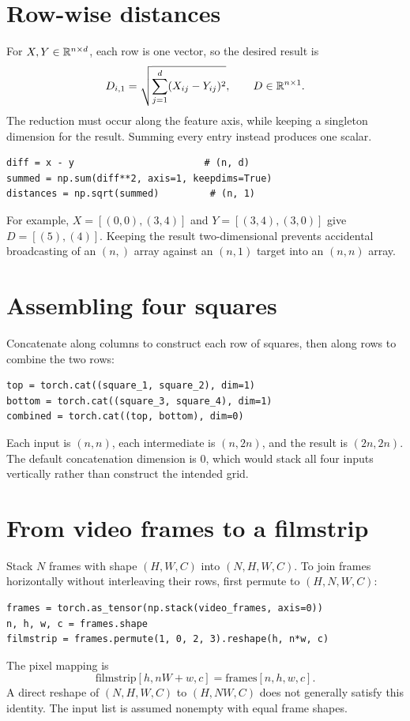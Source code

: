 


\section{Row-wise distances}
For $X,Y\in\mathbb{R}^{n\times d}$, each row is one vector, so the desired result is
\[
 D_{i,1}=\sqrt{\sum_{j=1}^d(X_{ij}-Y_{ij})^2},\qquad D\in\mathbb{R}^{n\times1}.
\]
The reduction must occur along the feature axis, while keeping a singleton
dimension for the result. Summing every entry instead produces one scalar.
\begin{lstlisting}
diff = x - y                       # (n, d)
summed = np.sum(diff**2, axis=1, keepdims=True)
distances = np.sqrt(summed)         # (n, 1)
\end{lstlisting}
For example, $X=[(0,0),(3,4)]$ and $Y=[(3,4),(3,0)]$ give
$D=[(5),(4)]$. Keeping the result two-dimensional prevents accidental
broadcasting of an $(n,)$ array against an $(n,1)$ target into an $(n,n)$ array.

\section{Assembling four squares}
Concatenate along columns to construct each row of squares, then along rows
to combine the two rows:
\begin{lstlisting}
top = torch.cat((square_1, square_2), dim=1)
bottom = torch.cat((square_3, square_4), dim=1)
combined = torch.cat((top, bottom), dim=0)
\end{lstlisting}
Each input is $(n,n)$, each intermediate is $(n,2n)$, and the result is
$(2n,2n)$. The default concatenation dimension is 0, which would stack all
four inputs vertically rather than construct the intended grid.

\section{From video frames to a filmstrip}
Stack $N$ frames with shape $(H,W,C)$ into $(N,H,W,C)$. To join frames
horizontally without interleaving their rows, first permute to $(H,N,W,C)$:
\begin{lstlisting}
frames = torch.as_tensor(np.stack(video_frames, axis=0))
n, h, w, c = frames.shape
filmstrip = frames.permute(1, 0, 2, 3).reshape(h, n*w, c)
\end{lstlisting}
The pixel mapping is
\[
 \mathrm{filmstrip}[h,nW+w,c]=\mathrm{frames}[n,h,w,c].
\]
A direct reshape of $(N,H,W,C)$ to $(H,NW,C)$ does not generally satisfy this
identity. The input list is assumed nonempty with equal frame shapes.

